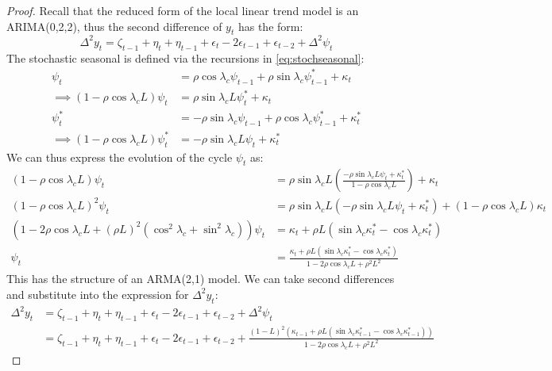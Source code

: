 \documentclass[DIV=14,titlepage=false]{scrreprt}
\begin{document}
\begin{proof}
    Recall that the reduced form of the local linear trend model is an ARIMA(0,2,2), thus the second difference of $y_t$ has the form:
    \[
        \Delta ^2 y_t = \zeta_{t-1} + \eta_t + \eta_{t-1} + \epsilon_t - 2\epsilon_{t-1} + \epsilon_{t-2} + \Delta^2 \psi_t
    \]
    The stochastic seasonal is defined via the recursions in \eqref{eq:stochseasonal}:
    \begin{align*}
        \psi_t &= \rho \cos \lambda_c \psi_{t-1} + \rho \sin \lambda_c \psi^*_{t-1} + \kappa_t\\
        \implies (1-\rho \cos \lambda_c L) \psi_t &= \rho \sin \lambda_c L \psi^*_{t} + \kappa_t\\
        \psi_t^* &= -\rho \sin \lambda_c \psi_{t-1} + \rho \cos \lambda_c \psi^*_{t-1} + \kappa_t^*\\
        \implies (1-\rho \cos \lambda_c L) \psi_t^* &= -\rho \sin \lambda_c L \psi_{t} + \kappa_t^*
    \end{align*}
    We can thus express the evolution of the cycle $\psi_t$ as:
    \begin{align*}
        (1-\rho \cos \lambda_c L)\psi_t &= \rho \sin \lambda_c L \left( \frac{-\rho \sin \lambda_c L \psi_t + \kappa_t^*}{1 - \rho \cos \lambda_c L} \right) + \kappa_t\\
        (1-\rho \cos \lambda_c L)^2 \psi_t &= \rho \sin \lambda_c L \left( -\rho \sin \lambda_c L \psi_t + \kappa_t^* \right) + (1-\rho \cos \lambda_c L) \kappa_t\\
        (1-2\rho \cos \lambda_c L + (\rho L )^2( \cos^2 \lambda_c + \sin^2 \lambda_c)) \psi_t &= \kappa_t +\rho L (\sin \lambda_c \kappa_t^* - \cos \lambda_c \kappa_t^*)\\
        \psi_t &= \frac{\kappa_t +\rho L (\sin \lambda_c \kappa_t^* - \cos \lambda_c \kappa_t^*)}{1-2\rho \cos \lambda_c L + \rho^2L^2}
    \end{align*}
    This has the structure of an ARMA(2,1) model. We can take second differences and substitute into the expression for $\Delta^2 y_t$:
    \begin{align*}
        \Delta^2 y_t &= \zeta_{t-1} + \eta_t + \eta_{t-1} + \epsilon_t - 2\epsilon_{t-1} + \epsilon_{t-2} + \Delta^2 \psi_t\\
        &= \zeta_{t-1} + \eta_t + \eta_{t-1} + \epsilon_t - 2\epsilon_{t-1} + \epsilon_{t-2} + \frac{(1-L)^2(\kappa_{t-1} +\rho L (\sin \lambda_c \kappa_{t-1}^* - \cos \lambda_c \kappa_{t-1}^*))}{1-2\rho \cos \lambda_c L + \rho^2L^2}
    \end{align*}

\end{proof}
\end{document}
